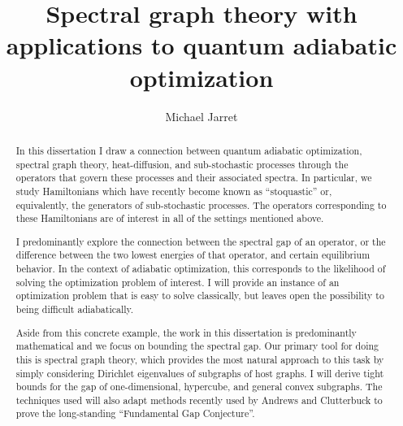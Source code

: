 \documentclass[letterpaper,12pt]{umd-thesis}
\title{Spectral graph theory with applications to quantum adiabatic optimization}
\author{Michael Jarret}
\numberwithin{equation}{chapter}
\numberwithin{thm}{chapter}
\numberwithin{lem}{chapter}
\numberwithin{cor}{chapter}
\numberwithin{definition}{chapter}
\begin{document}
\begin{abstract}
    In this dissertation I draw a connection between quantum adiabatic optimization, spectral graph theory, heat-diffusion, and sub-stochastic processes through the operators that govern these processes and their associated spectra. In particular, we study Hamiltonians which have recently become known as ``stoquastic'' or, equivalently, the generators of sub-stochastic processes. The operators corresponding to these Hamiltonians are of interest in all of the settings mentioned above.
    
    I predominantly explore the connection between the spectral gap of an operator, or the difference between the two lowest energies of that operator, and certain equilibrium behavior. In the context of adiabatic optimization, this corresponds to the likelihood of solving the optimization problem of interest. I will provide an instance of an optimization problem that is easy to solve classically, but leaves open the possibility to being difficult adiabatically.

	Aside from this concrete example, the work in this dissertation is predominantly mathematical and we focus on bounding the spectral gap. Our primary tool for doing this is spectral graph theory, which provides the most natural approach to this task by simply considering Dirichlet eigenvalues of subgraphs of host graphs. I will derive tight bounds for the gap of one-dimensional, hypercube, and general convex subgraphs. The techniques used will also adapt methods recently used by Andrews and Clutterbuck to prove the long-standing ``Fundamental Gap Conjecture''.
\end{abstract} 
\end{document}
